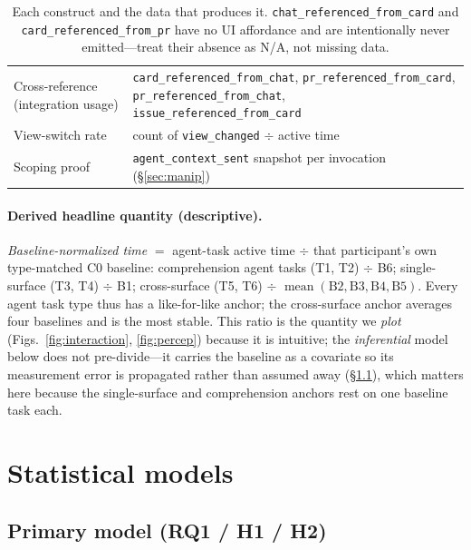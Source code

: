 \documentclass[11pt]{article}
\newcommand{\code}[1]{\texttt{#1}}
\begin{document}
\begin{table}[h]
\begin{tabularx}{\linewidth}{@{}L L@{}}
Cross-reference (integration usage) & \code{card\_referenced\_from\_chat}, \code{pr\_referenced\_from\_card}, \code{pr\_referenced\_from\_chat}, \code{issue\_referenced\_from\_card} \\
View-switch rate & count of \code{view\_changed} $\div$ active time \\
Scoping proof & \code{agent\_context\_sent} snapshot per invocation (\S\ref{sec:manip}) \\
\bottomrule
\end{tabularx}
\caption{Each construct and the data that produces it. \code{chat\_referenced\_from\_card} and \code{card\_referenced\_from\_pr} have no UI affordance and are intentionally never emitted---treat their absence as N/A, not missing data.}
\label{tab:measures}
\end{table}

\paragraph{Derived headline quantity (descriptive).} \emph{Baseline-normalized
time} $=$ agent-task active time $\div$ that participant's own type-matched C0
baseline: comprehension agent tasks (T1, T2) $\div$ B6; single-surface (T3, T4)
$\div$ B1; cross-surface (T5, T6) $\div$ $\operatorname{mean}(\text{B2},
\text{B3},\text{B4},\text{B5})$. Every agent task type thus has a like-for-like
anchor; the cross-surface anchor averages four baselines and is the most stable.
This ratio is the quantity we \emph{plot} (Figs.\ \ref{fig:interaction},
\ref{fig:percep}) because it is intuitive; the \emph{inferential} model below does
not pre-divide---it carries the baseline as a covariate so its measurement error
is propagated rather than assumed away (\S\ref{sec:primary}), which matters here
because the single-surface and comprehension anchors rest on one baseline task
each.

\section{Statistical models}

\subsection{Primary model (RQ1 / H1 / H2)}\label{sec:primary}
\end{document}
